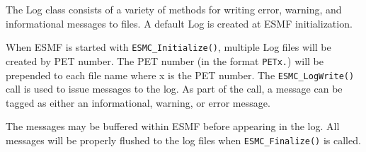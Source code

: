 


\label{sec:Log}

The Log class consists of a variety of methods for writing error, warning, and
informational messages to files.  A default Log is created at ESMF
initialization.

When ESMF is started with {\tt ESMC\_Initialize()}, multiple Log files will
be created by PET number.  The PET number (in the format
{\tt PETx.}) will be prepended to each file name where x is the PET number.
The {\tt ESMC\_LogWrite()} call is used to issue messages to the log.  As
part of the call, a message can be tagged as either an informational,
warning, or error message.

The messages may be buffered within ESMF before appearing in the log.
All messages will be properly flushed to the log files when {\tt ESMC\_Finalize()}
is called.
